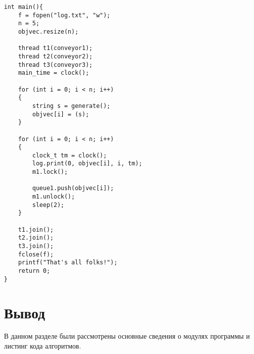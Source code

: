 \begin{center}
	\captionsetup{justification=raggedright,singlelinecheck=off}
	\begin{lstlisting}[label=brute,caption = Основная функция программы] 
int main(){
	f = fopen("log.txt", "w");
	n = 5;
	objvec.resize(n);
	
	thread t1(conveyor1);
	thread t2(conveyor2);
	thread t3(conveyor3);
	main_time = clock();
	
	for (int i = 0; i < n; i++)
	{
		string s = generate();
		objvec[i] = (s);
	}
	
	for (int i = 0; i < n; i++)
	{
		clock_t tm = clock();
		log.print(0, objvec[i], i, tm);
		m1.lock();
		
		queue1.push(objvec[i]);
		m1.unlock();
		sleep(2);
	}
	
	t1.join();
	t2.join();
	t3.join();
	fclose(f);
	printf("That's all folks!");
	return 0;
}
	\end{lstlisting}
\end{center}
\section*{Вывод}
В данном разделе были рассмотрены основные сведения о модулях программы и листинг кода алгоритмов. 

